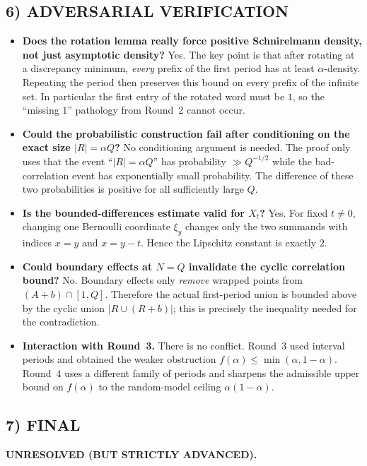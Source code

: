 \subsection*{6) ADVERSARIAL VERIFICATION}
\begin{itemize}
\item \textbf{Does the rotation lemma really force positive Schnirelmann density, not just asymptotic density?}
Yes. The key point is that after rotating at a discrepancy minimum, \emph{every} prefix of the first period has at least $\alpha$-density. Repeating the period then preserves this bound on every prefix of the infinite set. In particular the first entry of the rotated word must be $1$, so the ``missing $1$'' pathology from Round~2 cannot occur.

\item \textbf{Could the probabilistic construction fail after conditioning on the exact size $|R|=\alpha Q$?}
No conditioning argument is needed. The proof only uses that the event ``$|R|=\alpha Q$'' has probability $\gg Q^{-1/2}$ while the bad-correlation event has exponentially small probability. The difference of these two probabilities is positive for all sufficiently large $Q$.

\item \textbf{Is the bounded-differences estimate valid for $X_t$?}
Yes. For fixed $t\neq 0$, changing one Bernoulli coordinate $\xi_y$ changes only the two summands with indices $x=y$ and $x=y-t$. Hence the Lipschitz constant is exactly $2$.

\item \textbf{Could boundary effects at $N=Q$ invalidate the cyclic correlation bound?}
No. Boundary effects only \emph{remove} wrapped points from $(A+b)\cap[1,Q]$. Therefore the actual first-period union is bounded above by the cyclic union $|R\cup(R+b)|$; this is precisely the inequality needed for the contradiction.

\item \textbf{Interaction with Round~3.}
There is no conflict. Round~3 used interval periods and obtained the weaker obstruction $f(\alpha)\le \min(\alpha,1-\alpha)$. Round~4 uses a different family of periods and sharpens the admissible upper bound on $f(\alpha)$ to the random-model ceiling $\alpha(1-\alpha)$.
\end{itemize}

\subsection*{7) FINAL}
\textbf{UNRESOLVED (BUT STRICTLY ADVANCED).}

